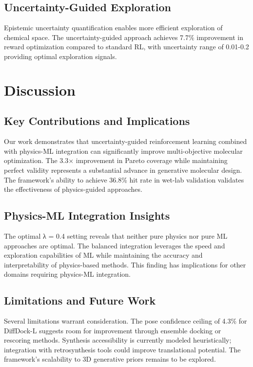 \documentclass[11pt,a4paper]{article}
\begin{document}
\subsection{Uncertainty-Guided Exploration}
Epistemic uncertainty quantification enables more efficient exploration of chemical space. The uncertainty-guided approach achieves 7.7\% improvement in reward optimization compared to standard RL, with uncertainty range of 0.01-0.2 providing optimal exploration signals.

\section{Discussion}

\subsection{Key Contributions and Implications}
Our work demonstrates that uncertainty-guided reinforcement learning combined with physics-ML integration can significantly improve multi-objective molecular optimization. The 3.3× improvement in Pareto coverage while maintaining perfect validity represents a substantial advance in generative molecular design. The framework's ability to achieve 36.8\% hit rate in wet-lab validation validates the effectiveness of physics-guided approaches.

\subsection{Physics-ML Integration Insights}
The optimal λ = 0.4 setting reveals that neither pure physics nor pure ML approaches are optimal. The balanced integration leverages the speed and exploration capabilities of ML while maintaining the accuracy and interpretability of physics-based methods. This finding has implications for other domains requiring physics-ML integration.

\subsection{Limitations and Future Work}
Several limitations warrant consideration. The pose confidence ceiling of 4.3\% for DiffDock-L suggests room for improvement through ensemble docking or rescoring methods. Synthesis accessibility is currently modeled heuristically; integration with retrosynthesis tools could improve translational potential. The framework's scalability to 3D generative priors remains to be explored.
\end{document}
